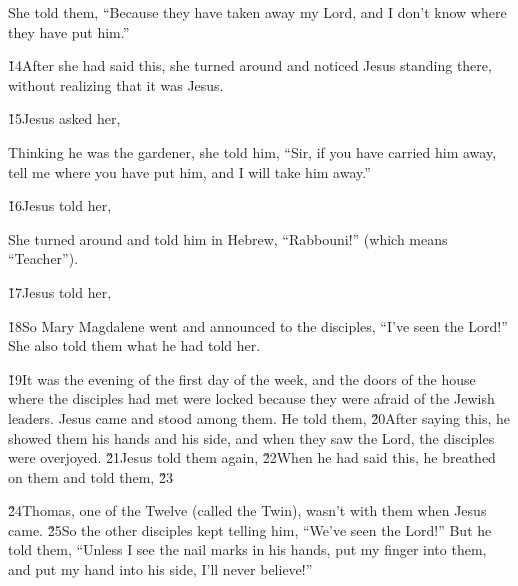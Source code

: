 She told them, ``Because they have taken away my Lord, and I don't know where they have put him.''

\v{14}After she had said this, she turned around and noticed Jesus standing there, without realizing that it was Jesus.

\v{15}Jesus asked her, 

Thinking he was the gardener, she told him, ``Sir, if you have carried him away, tell me where you have put him, and I will take him away.''

\v{16}Jesus told her, 

She turned around and told him in Hebrew, ``Rabbouni!'' (which means ``Teacher'').

\v{17}Jesus told her, 

\v{18}So Mary Magdalene went and announced to the disciples, ``I've seen the Lord!'' She also told them what he had told her.

\v{19}It was the evening of the first day of the week, and the doors of the house where the disciples had met were locked because they were afraid of the Jewish leaders. Jesus came and stood among them. He told them,  \v{20}After saying this, he showed them his hands and his side, and when they saw the Lord, the disciples were overjoyed. \v{21}Jesus told them again,  \v{22}When he had said this, he breathed on them and told them,  \v{23}

\v{24}Thomas, one of the Twelve (called the Twin), wasn't with them when Jesus came. \v{25}So the other disciples kept telling him, ``We've seen the Lord!'' But he told them, ``Unless I see the nail marks in his hands, put my finger into them, and put my hand into his side, I'll never believe!''

